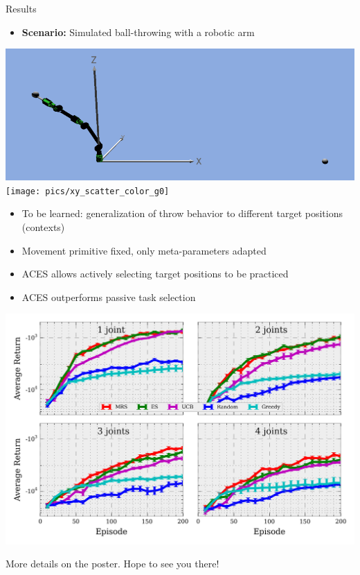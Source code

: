 \documentclass[11pt]{beamer}
\renewcommand{\emph}[1]{\textbf{#1}}
\begin{document}
\begin{frame}{Results}
   \begin{itemize}
     \item \emph{Scenario:} Simulated ball-throwing with a robotic arm
    \end{itemize}
    \begin{center}
       \includegraphics[width=.4\textwidth]{pics/compi.png}
       \hspace{1cm}
       \texttt{[image: pics/xy\_scatter\_color\_g0]}
   \end{center}

   \vspace*{-.5cm}
   \begin{center}
       \begin{minipage}[b][5cm][c]{.59\textwidth}
        \begin{itemize}
            \item To be learned: generalization of throw behavior to different target positions (contexts)
            \item Movement primitive fixed, only meta-parameters adapted
            \item ACES allows actively selecting target positions to be practiced
            \item ACES outperforms passive task selection
        \end{itemize}
        \end{minipage}
       \includegraphics[width=.4\textwidth]{../pics/learning_curve}
   \end{center}
   \vspace*{-.5cm}
   \begin{center}
   More details on the poster. Hope to see you there!
   \end{center}
\end{frame}
\end{document}
